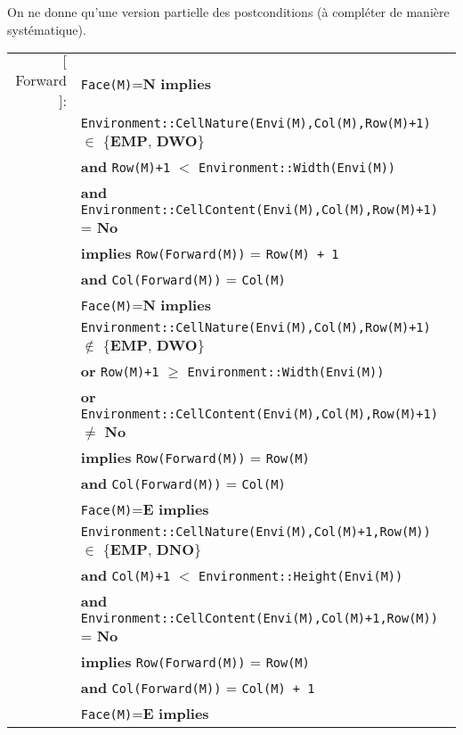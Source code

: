 \documentclass{article}
\begin{document}
On ne donne qu'une version partielle des postconditions (à compléter de manière systématique).

\begin{tabular}{rl}
$[$Forward$]$: & \texttt{Face(M)}=\textbf{N} \textbf{implies} \\
& \quad\quad\quad\quad \texttt{Environment::CellNature(Envi(M),Col(M),Row(M)+1)} $\in$ \{\textbf{EMP}, \textbf{DWO}\} \\
& \quad\quad\quad\quad \textbf{and} \texttt{Row(M)+1} $<$ \texttt{Environment::Width(Envi(M))} \\
& \quad\quad\quad\quad \textbf{and} \texttt{Environment::CellContent(Envi(M),Col(M),Row(M)+1)} = \textbf{No} \\
& \quad\quad\quad\quad \textbf{implies} \texttt{Row(Forward(M))} = \texttt{Row(M) + 1} \\
& \quad\quad\quad\quad \textbf{and} \texttt{Col(Forward(M))} = \texttt{Col(M)} \\
& \texttt{Face(M)}=\textbf{N} \textbf{implies} \\
& \quad\quad\quad\quad \texttt{Environment::CellNature(Envi(M),Col(M),Row(M)+1)} $\notin$ \{\textbf{EMP}, \textbf{DWO}\} \\
& \quad\quad\quad\quad \textbf{or} \texttt{Row(M)+1} $\geq$ \texttt{Environment::Width(Envi(M))} \\
& \quad\quad\quad\quad \textbf{or} \texttt{Environment::CellContent(Envi(M),Col(M),Row(M)+1)} $\neq$ \textbf{No} \\
& \quad\quad\quad\quad \textbf{implies} \texttt{Row(Forward(M))} = \texttt{Row(M)} \\
& \quad\quad\quad\quad \textbf{and} \texttt{Col(Forward(M))} = \texttt{Col(M)} \\
& \texttt{Face(M)}=\textbf{E} \textbf{implies} \\
& \quad\quad\quad\quad \texttt{Environment::CellNature(Envi(M),Col(M)+1,Row(M))} $\in$ \{\textbf{EMP}, \textbf{DNO}\} \\
& \quad\quad\quad\quad \textbf{and} \texttt{Col(M)+1} $<$ \texttt{Environment::Height(Envi(M))} \\
& \quad\quad\quad\quad \textbf{and} \texttt{Environment::CellContent(Envi(M),Col(M)+1,Row(M))} = \textbf{No} \\
& \quad\quad\quad\quad \textbf{implies} \texttt{Row(Forward(M))} = \texttt{Row(M)} \\
& \quad\quad\quad\quad \textbf{and} \texttt{Col(Forward(M))} = \texttt{Col(M) + 1} \\
& \texttt{Face(M)}=\textbf{E} \textbf{implies} \\

\end{tabular}
\end{document}
